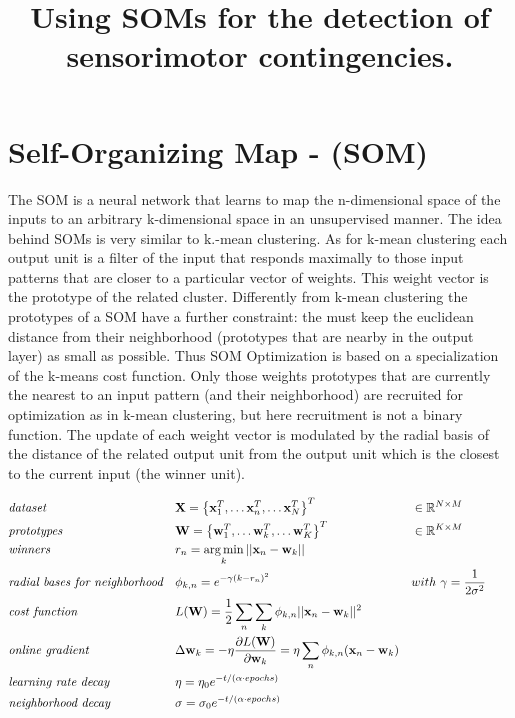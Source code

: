 \documentclass[a4paper]{article}
\title{Using SOMs for the detection of sensorimotor contingencies.}
\author{}
\DeclareMathOperator*{\argmin}{\operatorname*{arg\,min}} %
\begin{document}
\maketitle
\pagebreak
\section*{Self-Organizing Map - (SOM)}
The SOM is a neural network that learns to map the n-dimensional space of the inputs to an arbitrary k-dimensional space in an unsupervised manner. 
The idea behind SOMs is very similar to k.-mean clustering. As for k-mean clustering each output unit is a filter of the input that responds maximally to those input patterns that are closer to a particular vector of weights. This weight vector is the prototype of the related cluster. Differently from k-mean clustering the prototypes of a SOM have a further constraint: the must keep the euclidean distance from their neighborhood (prototypes that are nearby in the output layer) as small as possible.
Thus SOM Optimization is based on a specialization of the k-means cost function. Only those weights prototypes that are currently the nearest to an input pattern (and their neighborhood) are recruited for optimization as in k-mean clustering,  but here recruitment is not a binary function. The update of each weight vector is modulated by the radial basis of the distance of the related output unit from the output unit which is the closest to the current input (the winner unit).   


\begin{align}
	& \emph{dataset} && 
    \mathbf{X} = \left\{\mathbf{x}^T_1, 
    \dots\mathbf{x}^T_n, \dots\mathbf{x}^T_N\right\}^T && 
    \in\mathbb{R}^{N\times M} \nonumber\\
	& \emph{prototypes} &&
    \mathbf{W} = \left\{\mathbf{w}^T_1, 
    \dots\mathbf{w}^T_k, \dots\mathbf{w}^T_K\right\}^T && 
    \in\mathbb{R}^{K \times M} \nonumber\\
    & \emph{winners}&&  r_{n} = \argmin_k || 
    \mathbf{x}_n - \mathbf{w}_k || && \nonumber\\
    & \emph{radial bases for neighborhood} && 
    {\phi}_{k,n} = e^{{-\gamma (k - r_{n})^2}} && 
    with\ \gamma = \frac{1}{2\sigma^2}\nonumber\\
 	& \emph{cost function} &&
    L(\mathbf{W}) = \frac{1}{2} \sum_n \sum_k 
    \phi_{k, n} || \mathbf{x}_n - \mathbf{w}_k 
    || ^2 &&&&\nonumber\\
    & \emph{online gradient} && 
    \Delta{\mathbf{w}_{k}} = -\eta\frac{\partial L(\mathbf{W})}
    {\partial\mathbf{w}_k} = \eta\sum_{n}{ 
    \phi_{k, n}(\mathbf{x}_{n} -\mathbf{w}_{k})} && \nonumber\\
    & \emph{learning rate decay} && 
    \eta = \eta_0e^{ -t/(\alpha\cdot epochs)} && \nonumber\\
    & \emph{neighborhood decay} &&  \sigma = 
    \sigma_0e^{-t/(\alpha\cdot epochs)} && \nonumber   
\end{align}
\end{document}

